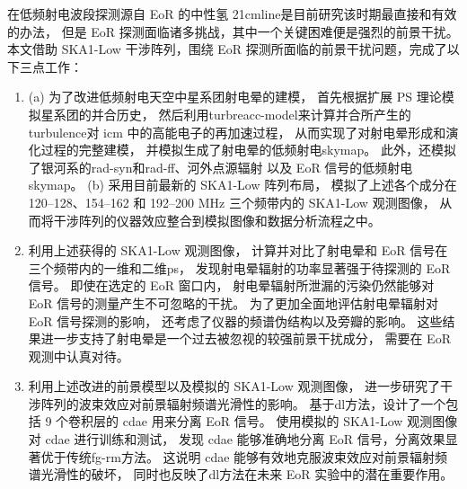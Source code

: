 
\begin{summary}

在低频射电波段探测源自 EoR 的中性氢 \ac{21cmline}是目前研究该时期最直接和有效的办法，
但是 EoR 探测面临诸多挑战，其中一个关键困难便是强烈的前景干扰。
本文借助 SKA1-Low 干涉阵列，围绕 EoR 探测所面临的前景干扰问题，完成了以下三点工作：
\begin{enumerate}
\item
(a) 为了改进低频射电天空中星系团射电晕的建模，
首先根据扩展 \ac{PS} 理论模拟星系团的并合历史，
然后利用\ac{turbreacc-model}来计算并合所产生的\ac{turbulence}对 \ac{icm}
中的高能电子的再加速过程，
从而实现了对射电晕形成和演化过程的完整建模，
并模拟生成了射电晕的低频射电\ac{skymap}。
此外，还模拟了银河系的\ac{rad-syn}和\ac{rad-ff}、河外点源辐射
以及 EoR 信号的低频射电\ac{skymap}。
(b) 采用目前最新的 SKA1-Low 阵列布局，
模拟了上述各个成分在 \numrange{120}{128}、\numrange{154}{162}
和 \numrange{192}{200} \si{\MHz} 三个频带内的 SKA1-Low 观测图像，
从而将干涉阵列的仪器效应整合到模拟图像和数据分析流程之中。

\item
利用上述获得的 SKA1-Low 观测图像，
计算并对比了射电晕和 EoR 信号在三个频带内的一维和二维\ac{ps}，
发现射电晕辐射的功率显著强于待探测的 EoR 信号。
即使在选定的 EoR 窗口内，
射电晕辐射所泄漏的污染仍然能够对 EoR 信号的测量产生不可忽略的干扰。
为了更加全面地评估射电晕辐射对 EoR 信号探测的影响，
还考虑了仪器的频谱伪结构以及旁瓣的影响。
这些结果进一步支持了射电晕是一个过去被忽视的较强前景干扰成分，
需要在 EoR 观测中认真对待。

\item
利用上述改进的前景模型以及模拟的 SKA1-Low 观测图像，
进一步研究了干涉阵列的波束效应对前景辐射频谱光滑性的影响。
基于\ac{dl}方法，设计了一个包括 9 个卷积层的 \ac{cdae} 用来分离 EoR 信号。
使用模拟的 SKA1-Low 观测图像对 \ac{cdae} 进行训练和测试，
发现 \ac{cdae} 能够准确地分离 EoR 信号，分离效果显著优于传统\ac{fg-rm}方法。
这说明 \ac{cdae} 能够有效地克服波束效应对前景辐射频谱光滑性的破坏，
同时也反映了\ac{dl}方法在未来 EoR 实验中的潜在重要作用。
\end{enumerate}



\end{summary}
